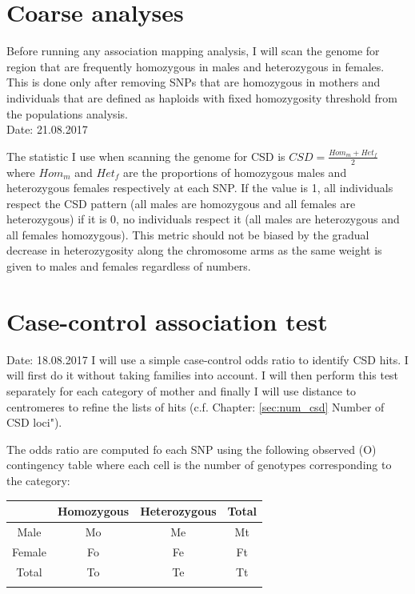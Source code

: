 \documentclass[10pt,a4paper]{report}
\begin{document}
\section{Coarse analyses}
Before running any association mapping analysis, I will scan the genome for region that are frequently homozygous in males and heterozygous in females. This is done only after removing SNPs that are homozygous in mothers and individuals that are defined as haploids with fixed homozygosity threshold from the populations analysis.\\

Date: 21.08.2017

The statistic I use when scanning the genome for CSD is $CSD=\frac{Hom_m+Het_f}{2}$ where $Hom_m$ and $Het_f$ are the proportions of homozygous males and heterozygous females respectively at each SNP. If the value is 1, all individuals respect the CSD pattern (all males are homozygous and all females are heterozygous) if it is 0, no individuals respect it (all males are heterozygous and all females homozygous). This metric should not be biased by the gradual decrease in heterozygosity along the chromosome arms as the same weight is given to males and females regardless of numbers. 

\section{Case-control association test}

Date: 18.08.2017
I will use a simple case-control odds ratio to identify CSD hits. I will first do it without taking families into account. I will then perform this test separately for each category of mother and finally I will use distance to centromeres to refine the lists of hits (c.f. Chapter: \ref{sec:num_csd} Number of CSD loci").

The odds ratio are computed fo each SNP using the following observed (O) contingency table where each cell is the number of genotypes corresponding to the category:

\begin{table}[h!]
\begin{tabular}{c|c c c}
& Homozygous & Heterozygous & Total\\
\hline
Male & Mo & Me & Mt\\
Female & Fo & Fe & Ft\\
Total & To & Te & Tt\\
\vspace{5px}
\end{tabular}
\end{table}
\end{document}
